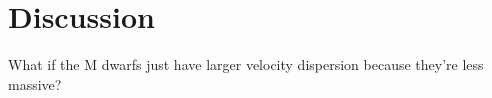 \section{Discussion}

What if the M dwarfs just have larger velocity dispersion because they're less
massive?
